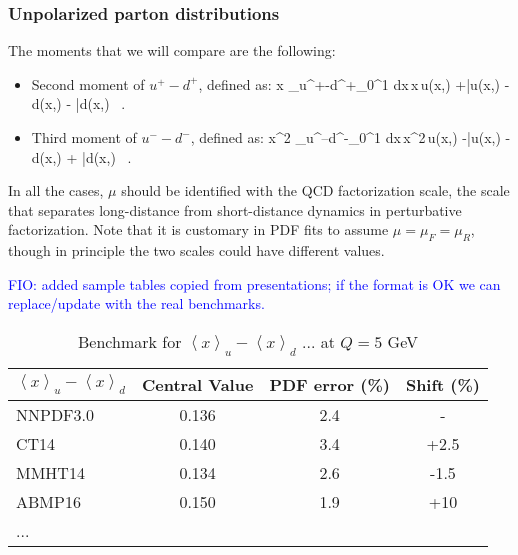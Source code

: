 \subsubsection{Unpolarized parton distributions}

The moments that we will compare are the following:

\begin{itemize}

\item Second moment of $u^+-d^+$, defined as:
  \be
  \la x \ra_{u^+-d^+}\equiv \int_0^1 dx\,x\,\lc u(x,\mu)
  +\bar{u}(x,\mu)
-d(x,\mu) - \bar{d}(x,\mu) \, .
  \rc
  \ee

\item Third moment of $u^--d^-$, defined as:
  \be
  \la x^2 \ra_{u^--d^-}\equiv \int_0^1 dx\,x^2\,\lc u(x,\mu)
  -\bar{u}(x,\mu)
-d(x,\mu) + \bar{d}(x,\mu) \, .
  \rc
  \ee

  \end{itemize}

In all the cases, $\mu$ should be identified with the QCD
factorization scale, the scale that separates
long-distance from short-distance dynamics in perturbative
factorization.
%
Note that it is customary in PDF fits to assume
$\mu=\mu_F=\mu_R$, though in principle the two scales
could have different values.


\textcolor{blue}{FIO: added sample tables copied from presentations; 
if the format is OK we can replace/update with the real benchmarks. }

\begin{table}[t]
\renewcommand{\arraystretch}{1.2} 
\centering
\begin{tabular}{@{}lccc@{}}
\hline 
\rule[-3 ex]{0pt}{7 ex}  %
$\left\langle x\right\rangle _{u}-\left\langle x\right\rangle _{d}$ 
   & Central Value & PDF error (\%) & Shift (\%) \\
\hline 
NNPDF3.0 & 0.136 & 2.4 & -\\
CT14 & 0.140 & 3.4 & +2.5 \\
MMHT14 & 0.134 & 2.6 & -1.5 \\
ABMP16 & 0.150 & 1.9 & +10 \\
... &  &  & \\
\hline 
\end{tabular}

\caption{Benchmark for $\left\langle x\right\rangle _{u}-\left\langle x\right\rangle _{d}$
... at $Q=5$ GeV}

\end{table}



